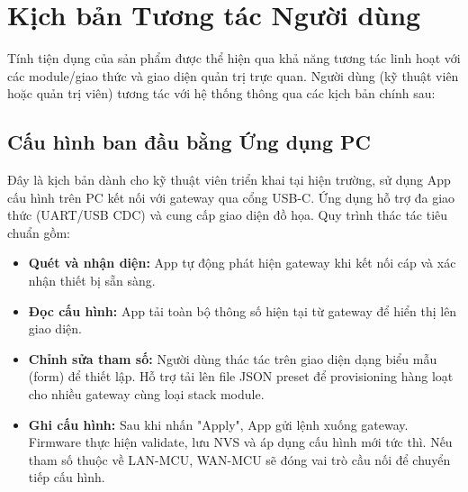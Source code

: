 \section{Kịch bản Tương tác Người dùng}

        
        
        


    Tính tiện dụng của sản phẩm được thể hiện qua khả năng tương tác linh hoạt với các module/giao thức và giao diện quản trị trực quan. Người dùng (kỹ thuật viên hoặc quản trị viên) tương tác với hệ thống thông qua các kịch bản chính sau:

    \subsection{Cấu hình ban đầu bằng Ứng dụng PC}
    Đây là kịch bản dành cho kỹ thuật viên triển khai tại hiện trường, sử dụng App cấu hình trên PC kết nối với gateway qua cổng USB-C. Ứng dụng hỗ trợ đa giao thức (UART/USB CDC) và cung cấp giao diện đồ họa. Quy trình thác tác tiêu chuẩn gồm:

    \begin{itemize}
        \item \textbf{Quét và nhận diện:} App tự động phát hiện gateway khi kết nối cáp và xác nhận thiết bị sẵn sàng.
        \item \textbf{Đọc cấu hình:} App tải toàn bộ thông số hiện tại từ gateway để hiển thị lên giao diện.
        \item \textbf{Chỉnh sửa tham số:} Người dùng thác tác trên giao diện dạng biểu mẫu (form) để thiết lập. Hỗ trợ tải lên file JSON preset để provisioning hàng loạt cho nhiều gateway cùng loại stack module.
        \item \textbf{Ghi cấu hình:} Sau khi nhấn "Apply", App gửi lệnh xuống gateway. Firmware thực hiện validate, lưu NVS và áp dụng cấu hình mới tức thì. Nếu tham số thuộc về LAN-MCU, WAN-MCU sẽ đóng vai trò cầu nối để chuyển tiếp cấu hình.
    \end{itemize}


